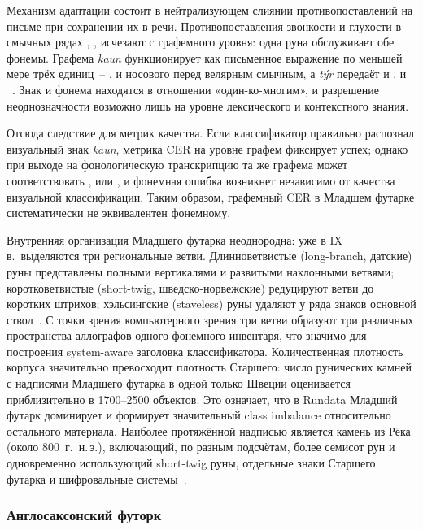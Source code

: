 \documentclass[a4paper,12pt]{extarticle}
\begin{document}
Механизм адаптации состоит в нейтрализующем слиянии противопоставлений на письме при сохранении их в речи. Противопоставления звонкости и глухости в смычных рядах , ,  исчезают с графемного уровня: одна руна обслуживает обе фонемы. Графема \textit{kaun} функционирует как письменное выражение по меньшей мере трёх единиц~-- ,  и носового  перед велярным смычным, а \textit{týr} передаёт и , и ~\cite{duwel2008,barnes2012,spurkland2005}. Знак и фонема находятся в отношении «один-ко-многим», и разрешение неоднозначности возможно лишь на уровне лексического и контекстного знания.
 
Отсюда следствие для метрик качества. Если классификатор правильно распознал визуальный знак \textit{kaun}, метрика CER на уровне графем фиксирует успех; однако при выходе на фонологическую транскрипцию та же графема может соответствовать ,  или , и фонемная ошибка возникнет независимо от качества визуальной классификации. Таким образом, графемный CER в Младшем футарке систематически не эквивалентен фонемному.
 
Внутренняя организация Младшего футарка неоднородна: уже в IX в.\ выделяются три региональные ветви. Длинноветвистые (long-branch, датские) руны представлены полными вертикалями и развитыми наклонными ветвями; коротковетвистые (short-twig, шведско-норвежские) редуцируют ветви до коротких штрихов; хэльсингские (staveless) руны удаляют у ряда знаков основной ствол~\cite{barnes2012,spurkland2005,duwel2008}. С точки зрения компьютерного зрения три ветви образуют три различных пространства аллографов одного фонемного инвентаря, что значимо для построения system-aware заголовка классификатора. Количественная плотность корпуса значительно превосходит плотность Старшего: число рунических камней с надписями Младшего футарка в одной только Швеции оценивается приблизительно в 1700--2500 объектов. Это означает, что в Rundata Младший футарк доминирует и формирует значительный class imbalance относительно остального материала. Наиболее протяжённой надписью является камень из Рёка (около 800~г.\ н.\,э.), включающий, по разным подсчётам, более семисот рун и одновременно использующий short-twig руны, отдельные знаки Старшего футарка и шифровальные системы~\cite{barnes2012}.
 
\subsubsection{Англосаксонский футорк}
 
\end{document}
